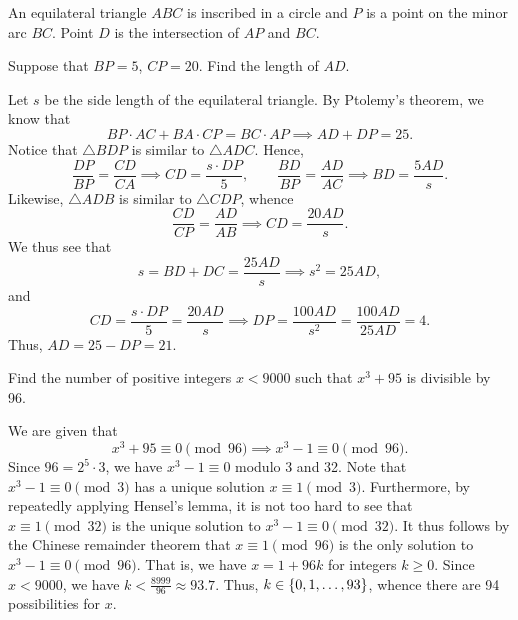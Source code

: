 \begin{question}[21]\label{A::2024-S-1-23}
    An equilateral triangle $ABC$ is inscribed in a circle and $P$ is a point on the minor arc $BC$. Point $D$ is the intersection of $AP$ and $BC$.

    \begin{center}
    \end{center}

    \noindent Suppose that $BP = 5$, $CP = 20$. Find the length of $AD$.
\end{question}
\begin{solution*}
    Let $s$ be the side length of the equilateral triangle. By Ptolemy's theorem, we know that \[BP \cdot AC + BA \cdot CP = BC \cdot AP \implies AD + DP = 25.\] Notice that $\triangle BDP$ is similar to $\triangle ADC$. Hence, \[\frac{DP}{BP} = \frac{CD}{CA} \implies CD = \frac{s \cdot DP}{5}, \qquad \frac{BD}{BP} = \frac{AD}{AC} \implies BD = \frac{5 AD}{s}.\] Likewise, $\triangle ADB$ is similar to $\triangle CDP$, whence \[\frac{CD}{CP} = \frac{AD}{AB} \implies CD = \frac{20 AD}{s}.\] We thus see that \[s = BD + DC = \frac{25 AD}{s} \implies s^2 = 25 AD,\] and \[CD = \frac{s \cdot DP}{5} = \frac{20 AD}{s} \implies DP = \frac{100 AD}{s^2} = \frac{100 AD}{25 AD} = 4.\] Thus, $AD = 25 - DP = 21$.
\end{solution*}

\begin{question}[94]\label{A::2024-S-1-24}
    Find the number of positive integers $x < 9000$ such that $x^3 + 95$ is divisible by 96.
\end{question}
\begin{solution*}
    We are given that \[x^3 + 95 \equiv 0 \pmod{96} \implies x^3  - 1 \equiv 0 \pmod{96}.\] Since $96 = 2^5 \cdot 3$, we have $x^3 - 1 \equiv 0$ modulo 3 and 32. Note that $x^3 - 1 \equiv 0 \pmod{3}$ has a unique solution $x \equiv 1 \pmod{3}$. Furthermore, by repeatedly applying Hensel's lemma, it is not too hard to see that $x \equiv 1 \pmod{32}$ is the unique solution to $x^3 - 1 \equiv 0 \pmod{32}$. It thus follows by the Chinese remainder theorem that $x \equiv 1 \pmod{96}$ is the only solution to $x^3 - 1 \equiv 0 \pmod{96}$. That is, we have $x = 1 + 96k$ for integers $k \geq 0$. Since $x < 9000$, we have $k < \frac{8999}{96} \approx 93.7$. Thus, $k \in \left\lbrace 0, 1, \ldots, 93 \right\rbrace$, whence there are 94 possibilities for $x$.
\end{solution*}

